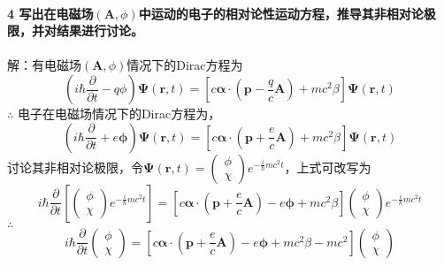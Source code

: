 \documentclass[12pt]{article}
\numberwithin{equation}{section}	 %
\begin{document}
\begin{spacing}{1.5}
\begin{equation}
\begin{aligned}
\end{aligned}
\end{equation}
~\\
~\\
\textbf{4 \quad 写出在电磁场$\left( \bm{A},\phi \right)$中运动的电子的相对论性运动方程，推导其非相对论极限，并对结果进行讨论。}\\
~\\
解：有电磁场$\left(\bm{A},\phi\right)$情况下的Dirac方程为
\begin{equation}
\left(i\hbar\frac{\partial}{\partial t}-q\phi\right) \bm\Psi\left(\bm{r},t\right) = \left[c\bm\alpha\cdot\left(\bm{p}-\frac{q}{c}\bm{A}\right)+mc^{2}\beta\right] \bm\Psi\left(\bm{r},t\right)
\end{equation}
$\therefore$ 电子在电磁场情况下的Dirac方程为，
\begin{equation}\nonumber 		%
\left(i\hbar\frac{\partial}{\partial t}+e\bm\phi\right) \bm\Psi\left(\bm{r},t\right) = \left[c\bm\alpha\cdot\left(\bm{p}+\frac{e}{c}\bm{A}\right)+mc^{2}\beta\right] \bm\Psi\left(\bm{r},t\right)
\end{equation}
讨论其非相对论极限，令$\displaystyle \bm\Psi\left(\bm{r},t\right) = \begin{pmatrix} \phi \\ \chi \end{pmatrix}e^{-\frac{i}{\hbar}mc^{2}t}$，上式可改写为
\begin{equation}
i\hbar\frac{\partial}{\partial t} \left[ \begin{pmatrix} \phi \\ \chi \end{pmatrix}e^{-\frac{i}{\hbar}mc^{2}t} \right] = \left[ c\bm\alpha\cdot\left(\bm{p} +\frac{e}{c}\bm{A}\right) - e\bm\phi +mc^{2}\beta \right]\begin{pmatrix} \phi \\ \chi \end{pmatrix}e^{-\frac{i}{\hbar}mc^{2}t}
\end{equation}
$\therefore$
\begin{equation}
i\hbar\frac{\partial}{\partial t} \begin{pmatrix} \phi \\ \chi \end{pmatrix} = \left[ c\bm\alpha\cdot\left(\bm{p} +\frac{e}{c}\bm{A}\right) - e\bm\phi +mc^{2}\beta -mc^{2} \right]\begin{pmatrix} \phi \\ \chi \end{pmatrix}

\end{equation}
\end{spacing}
\end{document}
